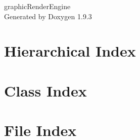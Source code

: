 \documentclass[twoside]{book}
\newcommand{\+}{\discretionary{\mbox{\scriptsize$\hookleftarrow$}}{}{}}
\newcommand{\clearemptydoublepage}{%
    \newpage{\pagestyle{empty}\cleardoublepage}%
  }
\begin{document}
  \raggedbottom
    \hypersetup{pageanchor=false,
                bookmarksnumbered=true,
                pdfencoding=unicode
               }
  \begin{titlepage}
  \vspace*{7cm}
  \begin{center}%
  {\Large graphic\+Render\+Engine}\\
  \vspace*{1cm}
  {\large Generated by Doxygen 1.9.3}\\
  \end{center}
  \end{titlepage}
  \clearemptydoublepage
  \tableofcontents
  \clearemptydoublepage
  \hypersetup{pageanchor=true}
\chapter{Hierarchical Index}

\chapter{Class Index}

\chapter{File Index}

\end{document}
